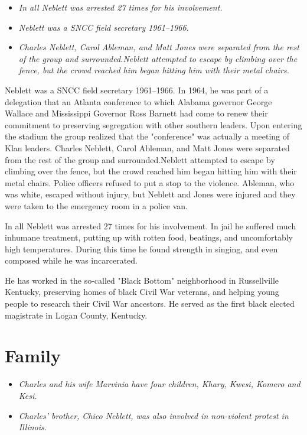 \begin{itemize}
\item
  \emph{In all Neblett was arrested 27 times for his involvement.}
\item
  \emph{Neblett was a SNCC field secretary 1961--1966.}
\item
  \emph{Charles Neblett, Carol Ableman, and Matt Jones were separated
  from the rest of the group and surrounded.Neblett attempted to escape
  by climbing over the fence, but the crowd reached him began hitting
  him with their metal chairs.}
\end{itemize}

Neblett was a SNCC field secretary 1961--1966. In 1964, he was part of a
delegation that an Atlanta conference to which Alabama governor George
Wallace and Mississippi Governor Ross Barnett had come to renew their
commitment to preserving segregation with other southern leaders. Upon
entering the stadium the group realized that the "conference" was
actually a meeting of Klan leaders. Charles Neblett, Carol Ableman, and
Matt Jones were separated from the rest of the group and
surrounded.Neblett attempted to escape by climbing over the fence, but
the crowd reached him began hitting him with their metal chairs. Police
officers refused to put a stop to the violence. Ableman, who was white,
escaped without injury, but Neblett and Jones were injured and they were
taken to the emergency room in a police van.

In all Neblett was arrested 27 times for his involvement. In jail he
suffered much inhumane treatment, putting up with rotten food, beatings,
and uncomfortably high temperatures. During this time he found strength
in singing, and even composed while he was incarcerated.

He has worked in the so-called "Black Bottom" neighborhood in
Russellville Kentucky, preserving homes of black Civil War veterans, and
helping young people to research their Civil War ancestors. He served as
the first black elected magistrate in Logan County, Kentucky.

\section{Family}\label{family}

\begin{itemize}
\item
  \emph{Charles and his wife Marvinia have four children, Khary, Kwesi,
  Komero and Kesi.}
\item
  \emph{Charles' brother, Chico Neblett, was also involved in
  non-violent protest in Illinois.}
\end{itemize}

